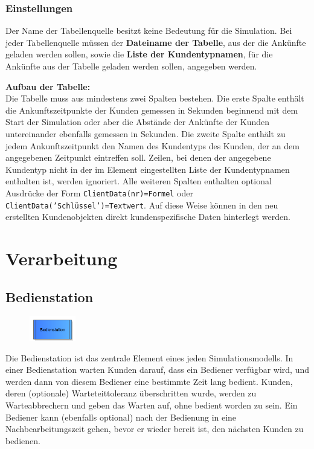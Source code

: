 \subsection*{Einstellungen}

Der Name der Tabellenquelle besitzt keine Bedeutung für die Simulation.
Bei jeder Tabellenquelle müssen der \textbf{Dateiname der Tabelle}, aus
der die Ankünfte geladen werden sollen, sowie die \textbf{Liste der Kundentypnamen},
für die Ankünfte aus der Tabelle geladen werden sollen, angegeben werden.

\textbf{Aufbau der Tabelle:}~\\
Die Tabelle muss aus mindestens zwei Spalten bestehen. Die erste Spalte enthält die Ankunftszeitpunkte
der Kunden gemessen in Sekunden beginnend mit dem Start der Simulation oder aber die Abstände
der Ankünfte der Kunden untereinander ebenfalls gemessen in Sekunden. Die zweite Spalte
enthält zu jedem Ankunftszeitpunkt den Namen des Kundentyps des Kunden, der an dem
angegebenen Zeitpunkt eintreffen soll. Zeilen, bei denen der angegebene Kundentyp
nicht in der im Element eingestellten Liste der Kundentypnamen enthalten ist, werden ignoriert.
Alle weiteren Spalten enthalten optional Ausdrücke der Form \texttt{ClientData(nr)=Formel}
oder \texttt{ClientData('Schlüssel')=Textwert}.
Auf diese Weise können in den neu erstellten Kundenobjekten direkt kundenspezifische Daten
hinterlegt werden. 





\chapter{Verarbeitung}

\section{Bedienstation}
\label{ref:ModelElementProcess}

\begin{figure}
\vspace{-22pt}
\includegraphics[width=2cm]{imageModelElementProcess.png}
\vspace{-22pt}
\end{figure}

Die Bedienstation ist das zentrale Element eines jeden Simulationsmodells. In einer Bedienstation warten Kunden darauf,
dass ein Bediener verfügbar wird, und werden dann von diesem Bediener eine bestimmte Zeit lang bedient. Kunden, deren
(optionale) Warteteittoleranz überschritten wurde, werden zu Warteabbrechern und geben das Warten auf, ohne bedient
worden zu sein. Ein Bediener kann (ebenfalls optional) nach der Bedienung in eine Nachbearbeitungszeit gehen, bevor
er wieder bereit ist, den nächsten Kunden zu bedienen.

